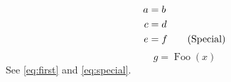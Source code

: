 \documentclass{article}
\DeclareMathOperator{\foo}{Foo}
\begin{document}
\begin{align}
a &= b\label{eq:first}\\
c &= d\notag\\
e &= f\tag{Special}\label{eq:special}
\end{align}
\begin{equation*}
g = \foo(x)\tag*{Proof}
\end{equation*}
See \ref{eq:first} and \autoref{eq:special}.
\end{document}
